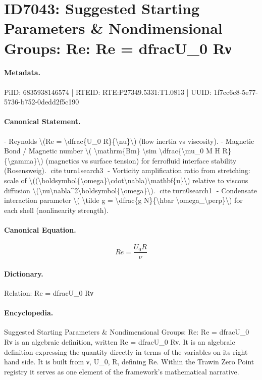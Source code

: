 \section*{ID7043: Suggested Starting Parameters \& Nondimensional Groups: Re: Re = dfracU\_0 Rν}
\paragraph{Metadata.}
PiID: 6835938146574 | RTEID: RTE:P27349.5331:T1.0813 | UUID: 1f7cc6c8-5e77-5736-b752-0dedd2f5c190

\paragraph{Canonical Statement.}
- Reynolds \textbackslash{}(Re = \textbackslash{}dfrac\{U\_0 R\}\{\textbackslash{}nu\}\textbackslash{}) (flow inertia vs viscosity). - Magnetic Bond / Magnetic number \textbackslash{}( \textbackslash{}mathrm\{Bm\} \textbackslash{}sim \textbackslash{}dfrac\{\textbackslash{}mu\_0 M H R\}\{\textbackslash{}gamma\}\textbackslash{}) (magnetics vs surface tension) for ferrofluid interface stability (Rosensweig). citeturn1search3 - Vorticity amplification ratio from stretching: scale of \textbackslash{}((\textbackslash{}boldsymbol\{\textbackslash{}omega\}\textbackslash{}cdot\textbackslash{}nabla)\textbackslash{}mathbf\{u\}\textbackslash{}) relative to viscous diffusion \textbackslash{}(\textbackslash{}nu\textbackslash{}nabla\textasciicircum{}2\textbackslash{}boldsymbol\{\textbackslash{}omega\}\textbackslash{}). citeturn0search1 - Condensate interaction parameter \textbackslash{}( \textbackslash{}tilde g = \textbackslash{}dfrac\{g N\}\{\textbackslash{}hbar \textbackslash{}omega\_\textbackslash{}perp\}\textbackslash{}) for each shell (nonlinearity strength).

\paragraph{Canonical Equation.}
\[
Re = \dfrac{U_0 R}{\nu}
\]

\paragraph{Dictionary.}
Relation: Re = dfracU\_0 Rν

\paragraph{Encyclopedia.}
Suggested Starting Parameters \& Nondimensional Groups: Re: Re = dfracU\_0 Rν is an algebraic definition, written Re = dfracU\_0 Rν. It is an algebraic definition expressing the quantity directly in terms of the variables on its right-hand side. It is built from ν, U\_0, R, defining Re. Within the Trawin Zero Point registry it serves as one element of the framework's mathematical narrative.
